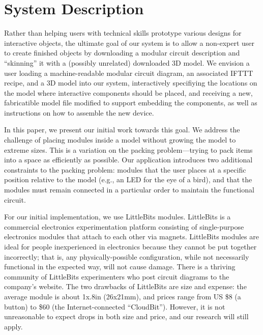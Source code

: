 \documentclass{chi-ext}
\begin{document}

	
\section{System Description}

	Rather than helping users with technical skills prototype various
	designs for interactive objects, the ultimate goal of our system is
	to allow a non-expert user to create finished objects by downloading
	a modular circuit description and ``skinning'' it with a (possibly
	unrelated) downloaded 3D model. We envision a user loading a
	machine-readable modular circuit diagram, an associated IFTTT
	recipe, and a 3D model into our
	system, interactively specifiying the locations on the model where
	interactive components should be placed, and receiving a new,
	fabricatible model file modified to support embedding the
	components, as well as instructions on how to assemble the new
	device.

	In this paper, we present our initial work towards this goal. We
	address the challenge of placing modules inside a model without
	growing the model to extreme sizes. This is a variation on the
	packing problem---trying to pack items into a space as efficiently
	as possible. Our application introduces two additional constraints
	to the packing problem: modules that the user places at a specific
	position relative to the model (e.g., an LED for the eye of a bird),
	and that the modules must remain connected in a particular order to
	maintain the functional circuit.

	For our initial implementation, we use LittleBits modules.
	LittleBits is a commercial electronics experimentation platform
	consisting of single-purpose electronics modules that attach to each
	other via magnets. LittleBits modules are ideal for people
	inexperienced in electronics because they cannot be put together
	incorrectly; that is, any physically-possible configuration, while
	not necessarily functional in the expected way, will not cause
	damage. There is a thriving community of LittleBits experimenters
	who post circuit diagrams to the company's website.
	The two drawbacks of LittleBits are size and expense: the average
	module is about 1x.8in (26x21mm), and prices range from US \$8 (a
	button) to \$60 (the Internet-connected ``CloudBit''). However, it
	is not unreasonable to expect drops in both size and price, and our
	research will still apply.
\end{document}
